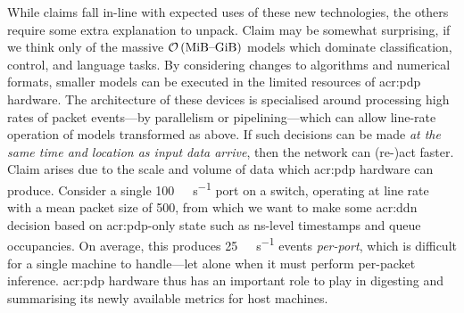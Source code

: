 While claims  fall in-line with expected uses of these new technologies, the others require some extra explanation to unpack.
Claim  may be somewhat surprising, if we think only of the massive $\mathcal{O}\left(\text{\unit{\mebi\byte}--\unit{\gibi\byte}}\right)$ models which dominate classification, control, and language tasks.
By considering changes to algorithms and numerical formats, smaller models can be executed in the limited resources of \gls{acr:pdp} hardware.
The architecture of these devices is specialised around processing high rates of packet events---by parallelism or pipelining---which can allow line-rate operation of models transformed as above.
If such decisions can be made \emph{at the same time and location as input data arrive}, then the network can (re-)act faster.
Claim  arises due to the scale and volume of data which \gls{acr:pdp} hardware can produce.
Consider a single \qty{100}{\giga\bit\per\second} port on a switch, operating at line rate with a mean packet size of \qty{500}{\byte}, from which we want to make some \gls{acr:ddn} decision based on \gls{acr:pdp}-only state such as \unit{\nano\second}-level timestamps and queue occupancies.
On average, this produces \qty[per-symbol=p,sticky-per=true]{25}{\mega\packet\per\second} events \emph{per-port}, which is difficult for a single machine to handle---let alone when it must perform per-packet inference.
\gls{acr:pdp} hardware thus has an important role to play in digesting and summarising its newly available metrics for host machines.



